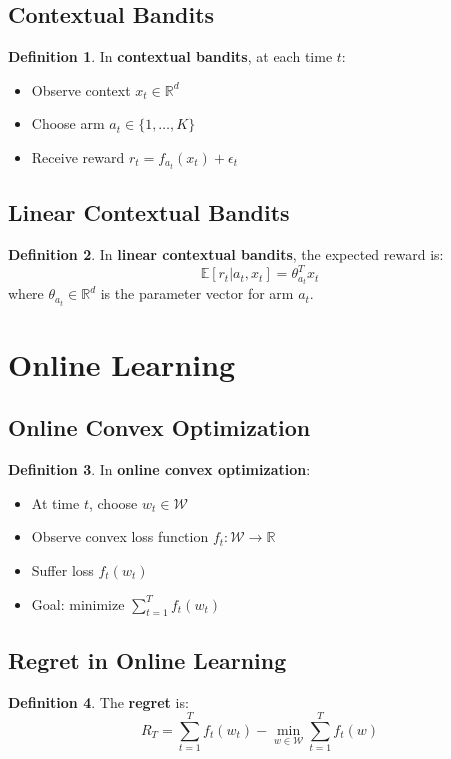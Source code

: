 \documentclass[11pt]{article}
\theoremstyle{definition}
\newtheorem{definition}{Definition}[section]
\begin{document}
\subsection{Contextual Bandits}
\begin{definition}
In \textbf{contextual bandits}, at each time $t$:
\begin{itemize}
    \item Observe context $x_t \in \mathbb{R}^d$
    \item Choose arm $a_t \in \{1, \ldots, K\}$
    \item Receive reward $r_t = f_{a_t}(x_t) + \epsilon_t$
\end{itemize}
\end{definition}

\subsection{Linear Contextual Bandits}
\begin{definition}
In \textbf{linear contextual bandits}, the expected reward is:
$$\mathbb{E}[r_t|a_t, x_t] = \theta_{a_t}^T x_t$$
where $\theta_{a_t} \in \mathbb{R}^d$ is the parameter vector for arm $a_t$.
\end{definition}

\section{Online Learning}

\subsection{Online Convex Optimization}
\begin{definition}
In \textbf{online convex optimization}:
\begin{itemize}
    \item At time $t$, choose $w_t \in \mathcal{W}$
    \item Observe convex loss function $f_t: \mathcal{W} \to \mathbb{R}$
    \item Suffer loss $f_t(w_t)$
    \item Goal: minimize $\sum_{t=1}^T f_t(w_t)$
\end{itemize}
\end{definition}

\subsection{Regret in Online Learning}
\begin{definition}
The \textbf{regret} is:
$$R_T = \sum_{t=1}^T f_t(w_t) - \min_{w \in \mathcal{W}} \sum_{t=1}^T f_t(w)$$
\end{definition}
\end{document}
